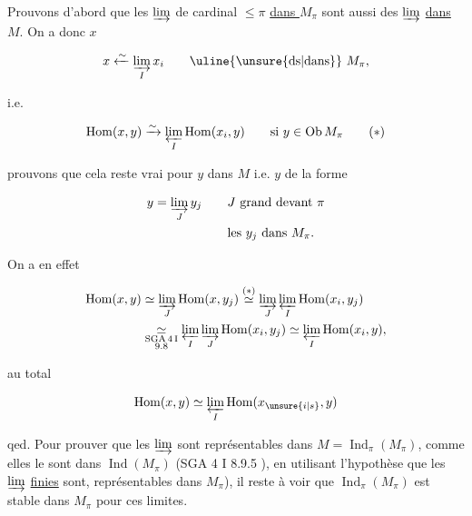 

Prouvons d'abord que les $\varinjlim$ de cardinal $\leq\pi$ \uline{dans $M_\pi$} sont aussi des $\varinjlim$ \uline{dans $M$}. On a donc  $x$

\[
x\xleftarrow{\sim}\varinjlim_I x_i\qquad \text{\uline{\unsure{ds|dans}} } M_{\pi},
\]

i.e.

\[
\operatorname{Hom}(x,y)\xrightarrow{\sim}\varprojlim_I\operatorname{Hom}(x_i,y)\qquad
\text{si } y\in\operatorname{Ob} M_\pi\tag*{$(\ast)$}
\]

prouvons que cela reste vrai pour $y$ dans $M$ i.e. $y$ de la forme

\[
\begin{aligned}
y=\varinjlim_J y_j\qquad &J\ \text{grand devant }\pi\\
&\text{les } y_j\text{ dans } M_\pi.
\end{aligned}
\]

On a en effet

\[
\begin{aligned}
\operatorname{Hom}(x,y)&\simeq\varinjlim_J\operatorname{Hom}(x,y_j)
\overset{(\ast)}{\simeq}\varinjlim_J\varprojlim_I\operatorname{Hom}(x_i,y_j)\\
&\underset{\substack{\mathrm{SGA}\,4\,\mathrm I\\9.8}}{\simeq}\varprojlim_I\varinjlim_J\operatorname{Hom}(x_i,y_j)
\simeq\varprojlim_I\operatorname{Hom}(x_i,y),
\end{aligned}
\]

au total

\[
\operatorname{Hom}(x,y)\simeq\varprojlim_I\operatorname{Hom}(x_{\unsure{i|s}},y)
\]

qed. Pour prouver que les  $\varinjlim$  sont représentables dans $M=\operatorname{Ind}_\pi(M_\pi)$, comme elles le sont dans $\operatorname{Ind}(M_\pi)$ (SGA 4 I 8.9.5 \unsure{)}), en utilisant l'hypothèse que les $\varinjlim$ \uline{finies} sont, représentables dans $M_\pi$), il reste à voir que $\operatorname{Ind}_\pi(M_\pi)$ est stable dans $M_\pi$ pour ces limites.

